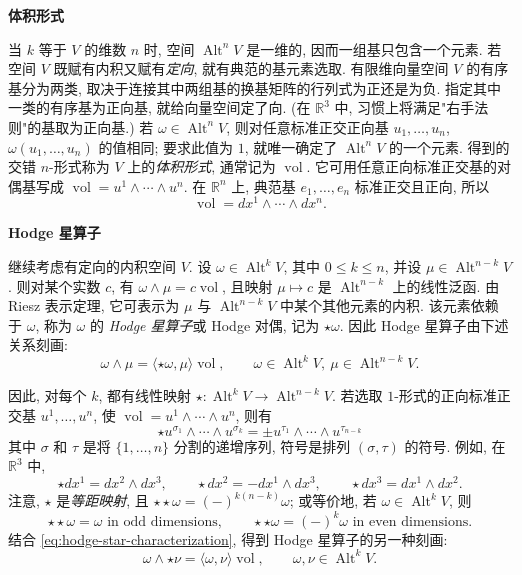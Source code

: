 \medskip\noindent\textbf{{体积形式}}\par
{当 $k$ 等于 $V$ 的维数 $n$ 时, 空间 $\operatorname{Alt}^nV$ 是一维的, 因而一组基只包含一个元素. 若空间 $V$ 既赋有内积又赋有\emph{定向}, 就有典范的基元素选取. 有限维向量空间 $V$ 的有序基分为两类, 取决于连接其中两组基的换基矩阵的行列式为正还是为负. 指定其中一类的有序基为正向基, 就给向量空间定了向. (在 $\mathbb R^3$ 中, 习惯上将满足"右手法则"的基取为正向基.) 若 $\omega\in\operatorname{Alt}^nV$, 则对任意标准正交正向基 $u_1,\ldots,u_n$, $\omega(u_1,\ldots,u_n)$ 的值相同; 要求此值为 $1$, 就唯一确定了 $\operatorname{Alt}^nV$ 的一个元素. 得到的交错 $n$-形式称为 $V$ 上的\emph{体积形式}, 通常记为 $\operatorname{vol}$. 它可用任意正向标准正交基的对偶基写成 $\operatorname{vol}=u^1\wedge\cdots\wedge u^n$. 在 $\mathbb R^n$ 上, 典范基 $e_1,\ldots,e_n$ 标准正交且正向, 所以}
\[
\operatorname{vol}=dx^1\wedge\cdots\wedge dx^n.
\]

\medskip\noindent\textbf{Hodge {星算子}}\par
{继续考虑有定向的内积空间 $V$. 设 $\omega\in\operatorname{Alt}^kV$, 其中 $0\leq k\leq n$, 并设 $\mu\in\operatorname{Alt}^{n-k}V$. 则对某个实数 $c$, 有 $\omega\wedge\mu=c\operatorname{vol}$, 且映射 $\mu\mapsto c$ 是 $\operatorname{Alt}^{n-k}$ 上的线性泛函. 由 Riesz 表示定理, 它可表示为 $\mu$ 与 $\operatorname{Alt}^{n-k}V$ 中某个其他元素的内积. 该元素依赖于 $\omega$, 称为 $\omega$ 的 \emph{Hodge 星算子}或 Hodge 对偶, 记为 $\star\omega$. 因此 Hodge 星算子由下述关系刻画:}
\begin{equation}\label{eq:hodge-star-characterization}
\omega\wedge\mu=\langle\star\omega,\mu\rangle\operatorname{vol},\qquad\omega\in\operatorname{Alt}^kV,\ \mu\in\operatorname{Alt}^{n-k}V.
\end{equation}

{因此, 对每个 $k$, 都有线性映射 $\star:\operatorname{Alt}^kV\to\operatorname{Alt}^{n-k}V$. 若选取 $1$-形式的正向标准正交基 $u^1,\ldots,u^n$, 使 $\operatorname{vol}=u^1\wedge\cdots\wedge u^n$, 则有}
\[
\star u^{\sigma_1}\wedge\cdots\wedge u^{\sigma_k}=\pm u^{\tau_1}\wedge\cdots\wedge u^{\tau_{n-k}}
\]
{其中 $\sigma$ 和 $\tau$ 是将 $\{1,\ldots,n\}$ 分割的递增序列, 符号是排列 $(\sigma,\tau)$ 的符号. 例如, 在 $\mathbb R^3$ 中,}
\[
\star dx^1=dx^2\wedge dx^3,\qquad\star dx^2=-dx^1\wedge dx^3,\qquad\star dx^3=dx^1\wedge dx^2.
\]
{注意, $\star$ 是\emph{等距映射}, 且 $\star\star\omega=(-)^{k(n-k)}\omega$; 或等价地, 若 $\omega\in\operatorname{Alt}^kV$, 则}
\[
\star\star\omega=\omega\text{ in odd dimensions},\qquad\star\star\omega=(-)^k\omega\text{ in even dimensions}.
\]
{结合 \eqref{eq:hodge-star-characterization}, 得到 Hodge 星算子的另一种刻画:}
\begin{equation}\label{eq:hodge-star-inner-product}
\omega\wedge\star\nu=\langle\omega,\nu\rangle\operatorname{vol},\qquad\omega,\nu\in\operatorname{Alt}^kV.
\end{equation}

